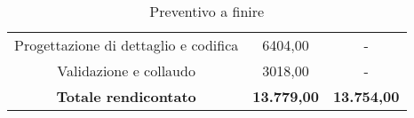 \begin{flushleft}
\begin{table}[!h]
\begin{center}
\begin{tabular}{ccc}
			Progettazione di dettaglio e codifica    & 6404,00  &  -	\\ 
  
			Validazione e collaudo    & 3018,00 & - 	\\ \hline
  
			\textbf{Totale rendicontato}& \textbf{13.779,00} & \textbf{13.754,00}	\\ \hline   
  
		\end{tabular}
  
		\caption{Preventivo a finire} 
  
	\end{center}
  
\end{table}

   \end{flushleft}